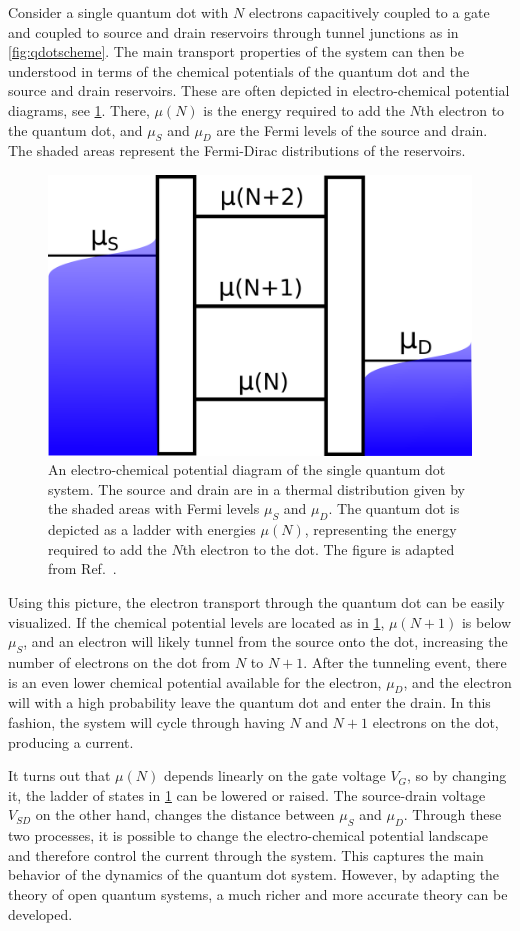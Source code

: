 \documentclass[../main.tex]{subfiles}
\begin{document}
Consider a single quantum dot with $N$ electrons capacitively coupled to a gate and coupled to source and drain reservoirs through tunnel junctions as in \cref{fig:qdotscheme}. The main transport properties of the system can then be understood in terms of the chemical potentials of the quantum dot and the source and drain reservoirs. These are often depicted in electro-chemical potential diagrams, see \cref{fig:ladder}. There, $\mu(N)$ is the energy required to add the $N$th electron to the quantum dot, and $\mu_S$ and $\mu_D$ are the Fermi levels of the source and drain. The shaded areas represent the Fermi-Dirac distributions of the reservoirs.
\begin{figure}[H]
    \centering
    \includegraphics[width=0.5\linewidth]{figures/ladder.png}
    \caption{An electro-chemical potential diagram of the single quantum dot system. The source and drain are in a thermal distribution given by the shaded areas with Fermi levels $\mu_S$ and $\mu_D$. The quantum dot is depicted as a ladder with energies $\mu(N)$, representing the energy required to add the $N$th electron to the dot. The figure is adapted from Ref.~\cite{transport}.}
    \label{fig:ladder}
\end{figure}
Using this picture, the electron transport through the quantum dot can be easily visualized. If the chemical potential levels are located as in \cref{fig:ladder}, $\mu(N + 1)$ is below $\mu_S$, and an electron will likely tunnel from the source onto the dot, increasing the number of electrons on the dot from $N$ to $N+1$. After the tunneling event, there is an even lower chemical potential available for the electron, $\mu_D$, and the electron will with a high probability leave the quantum dot and enter the drain. In this fashion, the system will cycle through having $N$ and $N+1$ electrons on the dot, producing a current.  

It turns out that $\mu(N)$ depends linearly on the gate voltage $V_G$, so by changing it, the ladder of states in \cref{fig:ladder} can be lowered or raised. The source-drain voltage $V_{SD}$ on the other hand, changes the distance between $\mu_S$ and $\mu_D$. Through these two processes, it is possible to change the electro-chemical potential landscape and therefore control the current through the system. This captures the main behavior of the dynamics of the quantum dot system. However, by adapting the theory of open quantum systems, a much richer and more accurate theory can be developed.
\end{document}
